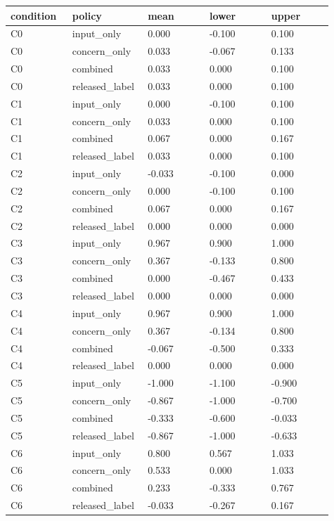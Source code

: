 \documentclass[11pt,a4paper]{article}
\begin{document}
\begingroup\scriptsize
\begin{longtable}{p{0.182\linewidth}p{0.182\linewidth}p{0.182\linewidth}p{0.182\linewidth}p{0.182\linewidth}}
\toprule
condition & policy & mean & lower & upper \\
\midrule
C0 & input\_only & 0.000 & -0.100 & 0.100 \\
C0 & concern\_only & 0.033 & -0.067 & 0.133 \\
C0 & combined & 0.033 & 0.000 & 0.100 \\
C0 & released\_label & 0.033 & 0.000 & 0.100 \\
C1 & input\_only & 0.000 & -0.100 & 0.100 \\
C1 & concern\_only & 0.033 & 0.000 & 0.100 \\
C1 & combined & 0.067 & 0.000 & 0.167 \\
C1 & released\_label & 0.033 & 0.000 & 0.100 \\
C2 & input\_only & -0.033 & -0.100 & 0.000 \\
C2 & concern\_only & 0.000 & -0.100 & 0.100 \\
C2 & combined & 0.067 & 0.000 & 0.167 \\
C2 & released\_label & 0.000 & 0.000 & 0.000 \\
C3 & input\_only & 0.967 & 0.900 & 1.000 \\
C3 & concern\_only & 0.367 & -0.133 & 0.800 \\
C3 & combined & 0.000 & -0.467 & 0.433 \\
C3 & released\_label & 0.000 & 0.000 & 0.000 \\
C4 & input\_only & 0.967 & 0.900 & 1.000 \\
C4 & concern\_only & 0.367 & -0.134 & 0.800 \\
C4 & combined & -0.067 & -0.500 & 0.333 \\
C4 & released\_label & 0.000 & 0.000 & 0.000 \\
C5 & input\_only & -1.000 & -1.100 & -0.900 \\
C5 & concern\_only & -0.867 & -1.000 & -0.700 \\
C5 & combined & -0.333 & -0.600 & -0.033 \\
C5 & released\_label & -0.867 & -1.000 & -0.633 \\
C6 & input\_only & 0.800 & 0.567 & 1.033 \\
C6 & concern\_only & 0.533 & 0.000 & 1.033 \\
C6 & combined & 0.233 & -0.333 & 0.767 \\
C6 & released\_label & -0.033 & -0.267 & 0.167 \\
\bottomrule
\end{longtable}
\endgroup
\end{document}
